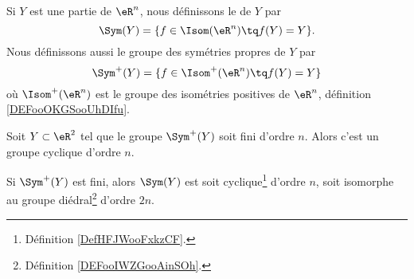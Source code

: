 \begin{definition}
	Si \( Y\) est une partie de \( \eR^n\), nous définissons le  de \( Y\) par
	\begin{equation}
		\Sym(Y)=\{ f\in\Isom(\eR^n)\tq f(Y)=Y \}.
	\end{equation}
	Nous définissons aussi le groupe des symétries propres de \( Y\) par
	\begin{equation}
		\Sym^+(Y)=\{ f\in\Isom^+(\eR^n)\tq f(Y)=Y \}
	\end{equation}
	où \( \Isom^+(\eR^n)\) est le groupe des isométries positives de \( \eR^n\), définition \ref{DEFooOKGSooUhDIfu}.
\end{definition}

\begin{theorem}      \label{THOooAYZVooPmCiWI}
	Soit \( Y\subset \eR^2\) tel que le groupe \( \Sym^+(Y)\) soit fini d'ordre \( n\). Alors c'est un groupe cyclique d'ordre \( n\).

	Si \( \Sym^+(Y)\) est fini, alors \( \Sym(Y)\) est soit cyclique\footnote{Définition \ref{DefHFJWooFxkzCF}.} d'ordre \( n\), soit isomorphe au groupe diédral\footnote{Définition \ref{DEFooIWZGooAinSOh}.} d'ordre \( 2n\).
\end{theorem}

